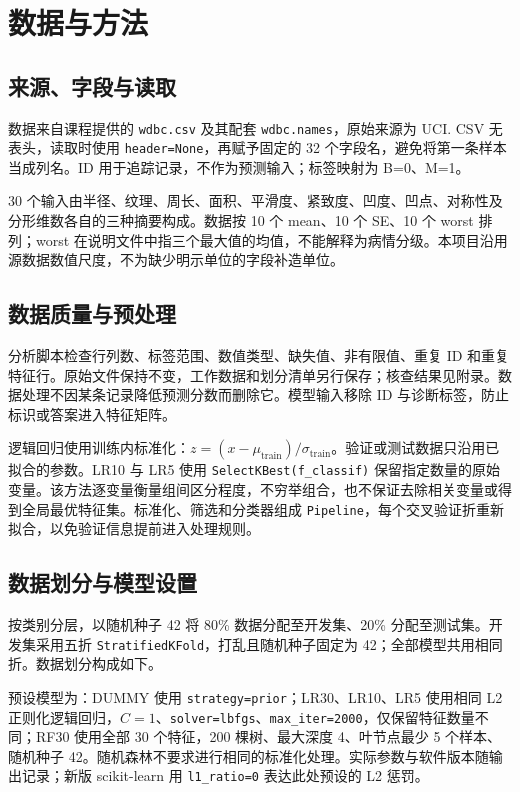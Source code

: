 \documentclass[UTF8,fontset=none,zihao=-4]{ctexart}
\begin{document}
\section{数据与方法}
\subsection{来源、字段与读取}
数据来自课程提供的 \texttt{wdbc.csv} 及其配套 \texttt{wdbc.names}，原始来源为 UCI\cite{uci}. CSV 无表头，读取时使用 \texttt{header=None}，再赋予固定的 32 个字段名，避免将第一条样本当成列名。ID 用于追踪记录，不作为预测输入；标签映射为 B=0、M=1。

30 个输入由半径、纹理、周长、面积、平滑度、紧致度、凹度、凹点、对称性及分形维数各自的三种摘要构成。数据按 10 个 mean、10 个 SE、10 个 worst 排列；worst 在说明文件中指三个最大值的均值，不能解释为病情分级。本项目沿用源数据数值尺度，不为缺少明示单位的字段补造单位。

\subsection{数据质量与预处理}
分析脚本检查行列数、标签范围、数值类型、缺失值、非有限值、重复 ID 和重复特征行。原始文件保持不变，工作数据和划分清单另行保存；核查结果见附录。数据处理不因某条记录降低预测分数而删除它。模型输入移除 ID 与诊断标签，防止标识或答案进入特征矩阵。

逻辑回归使用训练内标准化：$z=(x-\mu_{\mathrm{train}})/\sigma_{\mathrm{train}}$。验证或测试数据只沿用已拟合的参数。LR10 与 LR5 使用 \texttt{SelectKBest(f\_classif)} 保留指定数量的原始变量。该方法逐变量衡量组间区分程度，不穷举组合，也不保证去除相关变量或得到全局最优特征集。标准化、筛选和分类器组成 \texttt{Pipeline}，每个交叉验证折重新拟合，以免验证信息提前进入处理规则\cite{sklearnpitfalls,selectkbest}。

\subsection{数据划分与模型设置}
按类别分层，以随机种子 42 将 80\% 数据分配至开发集、20\% 分配至测试集。开发集采用五折 \texttt{StratifiedKFold}，打乱且随机种子固定为 42；全部模型共用相同折。数据划分构成如下。


预设模型为：DUMMY 使用 \texttt{strategy=prior}；LR30、LR10、LR5 使用相同 L2 正则化逻辑回归，$C=1$、\texttt{solver=lbfgs}、\texttt{max\_iter=2000}，仅保留特征数量不同；RF30 使用全部 30 个特征，200 棵树、最大深度 4、叶节点最少 5 个样本、随机种子 42。随机森林不要求进行相同的标准化处理。实际参数与软件版本随输出记录；新版 scikit-learn 用 \texttt{l1\_ratio=0} 表达此处预设的 L2 惩罚。
\end{document}
